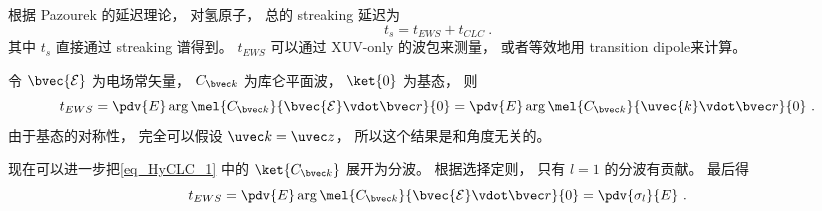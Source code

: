 
\begin{issues}
\issueDraft
\end{issues}


根据 Pazourek 的延迟理论， 对氢原子， 总的 streaking 延迟为
\begin{equation}
t_s = t_{EWS} + t_{CLC}~.
\end{equation}
其中 $t_s$ 直接通过 streaking 谱得到。 $t_{EWS}$ 可以通过 XUV-only 的波包来测量， 或者等效地用 transition dipole来计算。

令 $\bvec{\mathcal E}$ 为电场常矢量， $C_{\bvec k}$ 为库仑平面波， $\ket{0}$ 为基态， 则
\begin{equation}\label{eq_HyCLC_1}
t_{EWS} = \pdv{E} \arg \mel{C_{\bvec k}}{\bvec{\mathcal E}\vdot \bvec r}{0} = \pdv{E} \arg \mel{C_{\bvec k}}{\uvec{k}\vdot \bvec r}{0}~.
\end{equation}
由于基态的对称性， 完全可以假设 $\uvec k = \uvec z$， 所以这个结果是和角度无关的。

现在可以进一步把\autoref{eq_HyCLC_1} 中的 $\ket{C_{\bvec k}}$ 展开为分波。 根据选择定则， 只有 $l = 1$ 的分波有贡献。 最后得
\begin{equation}\label{eq_HyCLC_2}
t_{EWS} = \pdv{E} \arg \mel{C_{\bvec k}}{\bvec{\mathcal E}\vdot \bvec r}{0} = \pdv{\sigma_l}{E}~.
\end{equation}

